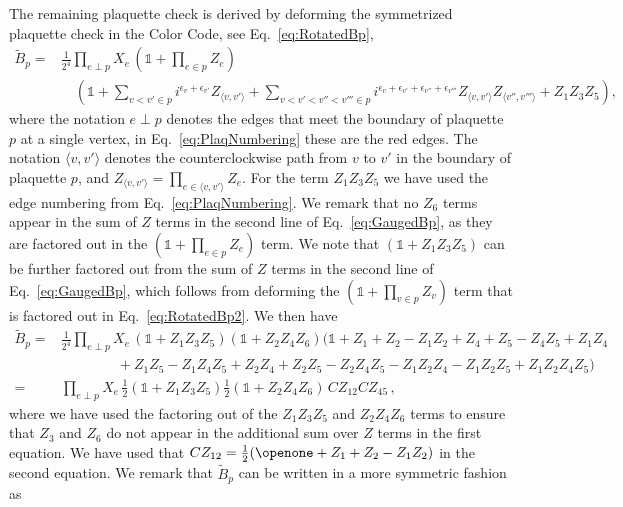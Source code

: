 The remaining plaquette check is derived by deforming the symmetrized plaquette check in the Color Code, see Eq.~\eqref{eq:RotatedBp}, 
\begin{align}
    \widetilde{B}_p  
    =& \frac{1}{2^{4}} \prod_{e \perp p} X_e \, (\mathds{1}+\prod_{e \in p} Z_e) 
    \nonumber \\
    & \quad (
    \mathds{1} + \sum_{v<v'\in p} i^{\epsilon_v+\epsilon_{v'}} Z_{\langle v,v' \rangle} + 
    \sum_{v<v'<v''<v'''\in p} i^{\epsilon_v+\epsilon_{v'}+\epsilon_{v''}+\epsilon_{v'''}} Z_{\langle v,v'\rangle }Z_{\langle v'',v'''\rangle} + Z_1 Z_3 Z_5
    ) ,
    \label{eq:GaugedBp}
\end{align}
where the notation $e \perp p$ denotes the edges that meet the boundary of plaquette $p$ at a single vertex, in Eq.~\eqref{eq:PlaqNumbering} these are the red edges.
The notation $\langle v, v' \rangle$ denotes the counterclockwise path from $v$ to $v'$ in the boundary of plaquette $p$, and $Z_{\langle v,v'\rangle}=\prod_{e \in \langle v,v'\rangle} Z_e$. 
For the term $Z_1 Z_3 Z_5$ we have used the edge numbering from Eq.~\eqref{eq:PlaqNumbering}. 
We remark that no $Z_6$ terms appear in the sum of $Z$ terms in the second line of Eq.~\eqref{eq:GaugedBp}, as they are factored out in the $(\mathds{1}+\prod_{e \in p} Z_e)$ term. 
We note that $(\mathds{1} + Z_1Z_3Z_5)$ can be further factored out from the sum of $Z$ terms in the second line of Eq.~\eqref{eq:GaugedBp}, which follows from deforming the $ (\mathds{1} + \prod_{v\in p} Z_v)$ term that is factored out in Eq.~\eqref{eq:RotatedBp2}. 
We then have 
\begin{align}
    \widetilde{B}_p  
    =& 
    \frac{1}{2^{4}} \prod_{e \perp p} X_e \, (\mathds{1} + Z_1Z_3Z_5) (\mathds{1} + Z_2Z_4Z_6)
    (
    \mathds{1} + Z_1 + Z_2 - Z_1Z_2 + Z_4 + Z_5 - Z_4Z_5 + Z_1 Z_4 
    \nonumber 
    \\
    & \qquad \qquad + Z_1 Z_5   - Z_1 Z_4 Z_5 + Z_2 Z_4 + Z_2 Z_5 - Z_2 Z_4 Z_5 - Z_1 Z_2 Z_4 - Z_1 Z_2 Z_5 + Z_1 Z_2 Z_4 Z_5
    ) 
    \\
    =&
     \prod_{e \perp  p} X_e \, \frac{1}{2}(\mathds{1} + Z_1Z_3Z_5) \frac{1}{2}(\mathds{1} + Z_2Z_4Z_6) \,
     CZ_{12} CZ_{45} \,
    ,
\end{align}
where we have used the factoring out of the $ Z_1Z_3Z_5$ and $Z_2Z_4Z_6$ terms to ensure that $Z_3$ and $Z_6$ do not appear in the additional sum over $Z$ terms in the first equation. 
We have used that $CZ_{12}=\frac{1}{2} ( \openone +Z_1 +Z_2 -Z_1Z_2)$ in the second equation. 
We remark that $\widetilde{B}_p$ can be written in a more symmetric fashion as 
